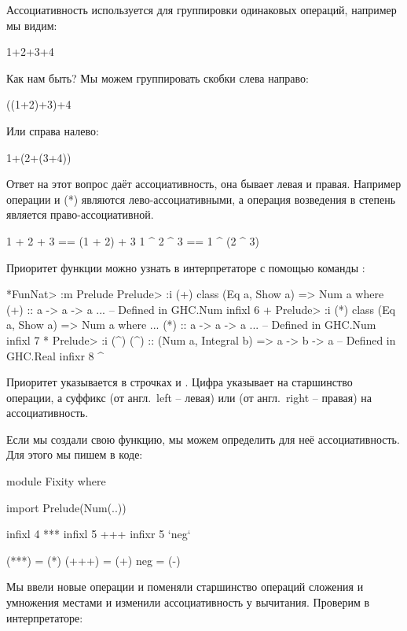 Ассоциативность используется для группировки одинаковых
операций, например мы видим:

\begin{code}
1+2+3+4
\end{code}

Как нам быть? Мы можем группировать скобки слева направо:

\begin{code}
((1+2)+3)+4
\end{code}

Или справа налево:

\begin{code}
1+(2+(3+4))
\end{code}

Ответ на этот вопрос даёт ассоциативность, она бывает левая и
правая. Например операции \In{(+)} \In{(-)} и (*) являются лево-ассоциативными,
а операция возведения в степень \In{(^)} является право-ассоциативной.

\begin{code}
1 + 2 + 3 == (1 + 2) + 3
1 ^ 2 ^ 3 ==  1 ^ (2 ^ 3)
\end{code}


Приоритет функции можно узнать в интерпретаторе с помощью
команды :

\begin{code}
*FunNat> :m Prelude
Prelude> :i (+)
class (Eq a, Show a) => Num a where
  (+) :: a -> a -> a
  ...
  	-- Defined in GHC.Num
infixl 6 +
Prelude> :i (*)
class (Eq a, Show a) => Num a where
  ...
  (*) :: a -> a -> a
  ...
  	-- Defined in GHC.Num
infixl 7 *
Prelude> :i (^)
(^) :: (Num a, Integral b) => a -> b -> a 	-- Defined in GHC.Real
infixr 8 ^
\end{code}

Приоритет указывается в строчках  и .
Цифра указывает на старшинство операции, а суффикс  
(от англ.~left -- левая) или  (от англ.~right -- правая)
на ассоциативность. 

Если мы создали свою функцию, мы можем определить для 
неё ассоциативность. Для этого мы пишем в коде:

\begin{code}
module Fixity where

import Prelude(Num(..))

infixl 4 *** 
infixl 5 +++
infixr 5 `neg`

(***) = (*)
(+++) = (+)
neg   = (-)
\end{code}

Мы ввели новые операции и поменяли старшинство операций
сложения и умножения местами и изменили ассоциативность 
у вычитания. Проверим в интерпретаторе:

